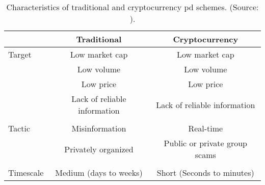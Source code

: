 \begin{table}[ht]
    \centering
    \begin{tabular}{l c c}
    \hline
     &\textbf{Traditional} & \textbf{Cryptocurrency}\\
    \hline
     Target   & Low market cap & Low market cap \\
              & Low volume     & Low volume \\
              & Low price      & Low price \\
              & Lack of reliable information & Lack of reliable information\\
              \\
    Tactic    & Misinformation & Real-time\\
              & Privately organized & Public or private group scams\\
              \\
    Timescale & Medium (days to weeks) & Short (Seconds to minutes)\\
    \hline
    \end{tabular}
    \caption[\acl{pd} characteristics]{Characteristics of traditional and cryptocurrency \ac{pd} schemes. (Source: \cite{P&D_to_the_moon}). }
    \label{tab:pd_characteristics}
\end{table}